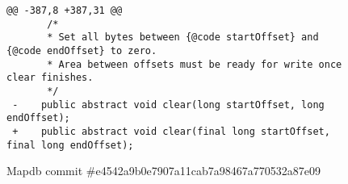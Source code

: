 
\begin{figure*}
\begin{lstlisting}
@@ -387,8 +387,31 @@ 
       /*
       * Set all bytes between {@code startOffset} and {@code endOffset} to zero.
       * Area between offsets must be ready for write once clear finishes.
       */
 -    public abstract void clear(long startOffset, long endOffset);
 +    public abstract void clear(final long startOffset, final long endOffset);
  \end{lstlisting}
\caption{Mapdb commit \#e4542a9b0e7907a11cab7a98467a770532a87e09\label{fig:final}}
\end{figure*}